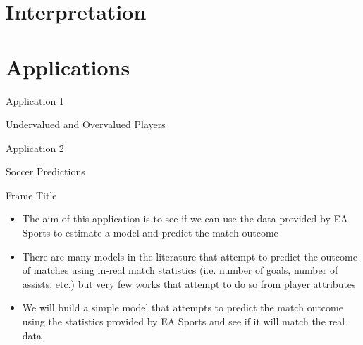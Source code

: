 \documentclass[aspectratio=169,xcolor=dvipsnames]{beamer}
\begin{document}

\section{Interpretation}


\section{Applications}


\begin{frame}{}
    \centering
    \begin{Large}
    Application 1\\
    \end{Large}
    \vspace{0.5cm}
    \begin{Huge}
    Undervalued and Overvalued Players
    \end{Huge}
\end{frame}

\begin{frame}{}
    \centering
    \begin{Large}
    Application 2\\
    \end{Large}
    \vspace{0.5cm}
    \begin{Huge}
    Soccer Predictions
    \end{Huge}
\end{frame}


\begin{frame}{Frame Title}
\begin{itemize}
    
    \item The aim of this application is to see if we can use the data provided by EA Sports to estimate a model and predict the match outcome
    
    \item There are many models in the literature that attempt to predict the outcome of matches using in-real match statistics (i.e. number of goals, number of assists, etc.) but very few works that attempt to do so from player attributes
    
    \item We will build a simple model that attempts to predict the match outcome using the statistics provided by EA Sports and see if it will match the real data
\end{itemize}

\end{frame}
\end{document}
